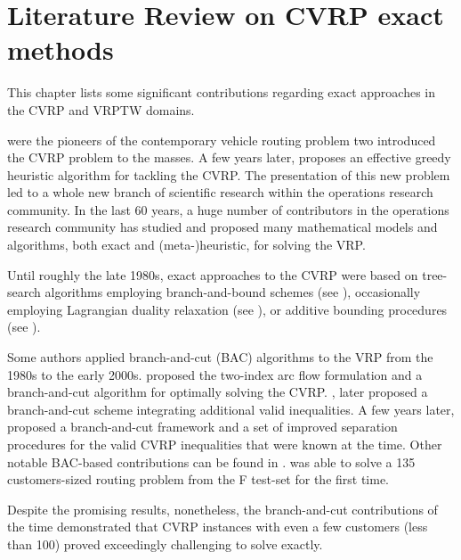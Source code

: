 \chapter{Literature Review on CVRP exact methods}
\label{sec:intro-literature-review}

This chapter lists some significant contributions regarding exact approaches
in the CVRP and VRPTW domains.

\textcite{dantzig1959} were
the pioneers of the contemporary vehicle routing problem two
introduced the CVRP problem to the masses.
A few years later, \textcite{clarke1964} proposes
an effective greedy heuristic algorithm for tackling the CVRP.
The presentation of this new problem led to a whole new branch
of scientific research within the operations research community.
In the last 60 years, a huge number of contributors in
the operations research community has studied and proposed many
mathematical models and algorithms, both exact and (meta-)heuristic,
for solving the VRP.

Until roughly the late 1980s, exact approaches to the CVRP were
based on tree-search algorithms employing branch-and-bound schemes
(see \cite{pierce1969, christofides1969, christofides1981exact, laporte1986}),
occasionally employing Lagrangian duality relaxation (see \cite{fisher1994, miller1995}),
or additive bounding procedures (see \cite{fischetti1994a, hadjiconstantinou1995}).

Some authors applied branch-and-cut (BAC) algorithms  to the VRP from the 1980s to the early 2000s.
\textcite{laporte1983, laporte1985} proposed the two-index arc flow formulation
and a branch-and-cut algorithm for optimally solving the CVRP.
\Textcite{augerat1995approche}, later proposed a branch-and-cut scheme
integrating additional valid inequalities.
A few years later, \textcite{lysgaard2004}
proposed a branch-and-cut framework and
a set of improved separation procedures for the valid CVRP inequalities that were known at the time.
Other notable BAC-based contributions
can be found in \textcite{araqueg1994, augerat1995, achuthan1996, blasum2000, ralphs2003, achuthan2003, baldacci2004}.
\citeauthor{baldacci2004} was able to solve a 135 customers-sized routing problem
from the F test-set  \textcite{fisher1994}
for the first time.

Despite the promising results, nonetheless,
the branch-and-cut contributions of the time demonstrated
that CVRP instances with even a few customers (less than 100)
proved exceedingly challenging to solve exactly.

